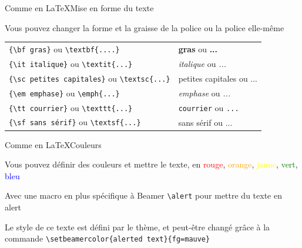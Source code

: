\documentclass[french]{beamer}
\begin{document}
  \begin{frame}[fragile]{Comme en \LaTeX}{Mise en forme du texte}
    \begin{block}{}
      Vous pouvez changer la forme et la graisse de la police ou la police elle-même
      \newsavebox\graissetexte
      \begin{lrbox}{\graissetexte}
      \begin{minipage}{\textwidth}
        \begin{tabular}{ll}
          \verb|{\bf gras}| ou \verb|\textbf{....}| & {\bf gras} ou \textbf{...}\\
          \verb|{\it italique}| ou \verb|\textit{...}| & {\it italique} ou \textit{...}\\
          \verb|{\sc petites capitales}| ou \verb|\textsc{...}| & {\sc petites capitales} ou \textsc{...}\\
          \verb|{\em emphase}| ou \verb|\emph{...}| & {\em emphase} ou \emph{...}\\
          \verb|{\tt courrier}| ou \verb|\texttt{...}| & {\tt courrier} ou \texttt{...}\\
          \verb|{\sf sans sérif}| ou \verb|\textsf{...}| & {\sf sans sérif} ou \textsf{...}
        \end{tabular}
      \end{minipage}
      \end{lrbox}
      \resizebox{0.85\textwidth}{!}{\usebox\graissetexte}
    \end{block}
  \end{frame}

  \begin{frame}[fragile]{Comme en \LaTeX}{Couleurs}
    \begin{block}{}
      Vous pouvez définir des couleurs et mettre le texte, en \textcolor{red}{rouge}, \textcolor{orange}{orange}, \textcolor{yellow}{jaune}, \textcolor{green}{vert}, \textcolor{blue}{bleu}
      
      Avec une macro en plus spécifique à Beamer \verb:\alert: pour mettre du \alert{texte en alert}
      
      Le style de ce texte est défini par le thème, et peut-être changé grâce à la commande \verb:\setbeamercolor{alerted text}{fg=mauve}:
    \end{block}
  \end{frame}
  
\end{document}
